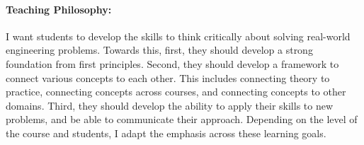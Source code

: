 \documentclass[10pt]{article}
\begin{document}
\paragraph{Teaching Philosophy: }
I want students to develop the skills to think critically about solving real-world engineering problems. 
Towards this, first, they should develop a strong foundation from first principles. Second, they should develop a framework to connect various concepts to each other. This includes connecting theory to practice, connecting concepts across courses, and connecting concepts to other domains. Third, they should develop the ability to apply their skills to new problems, and be able to communicate their approach. Depending on the level of the course and students, I adapt the emphasis across these learning goals.\\





\end{document}
